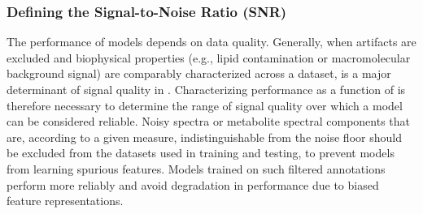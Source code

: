 \subsubsection{Defining the Signal-to-Noise Ratio (SNR)}
\label{sec:dataModel:subsec:curation:subsubsec:SNR}
The performance of \DL models depends on data quality. Generally, when artifacts are excluded and biophysical properties (e.g., lipid contamination or macromolecular background signal) are comparably characterized across a dataset, \SNR is a major determinant of signal quality in \MRS. Characterizing performance as a function of \SNR is therefore necessary to determine the range of signal quality over which a model can be considered reliable. Noisy spectra or metabolite spectral components that are, according to a given measure, indistinguishable from the noise floor should be excluded from the datasets used in training and testing, to prevent \DL models from learning spurious features. Models trained on such filtered annotations perform more reliably and avoid degradation in performance due to biased feature representations. 

